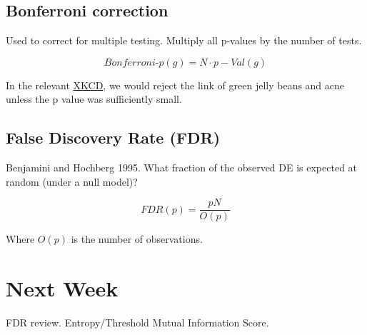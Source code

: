 \documentclass[a4paper]{article}
\begin{document}
\subsection{Bonferroni correction}
Used to correct for multiple testing. Multiply all p-values by the number of tests.

\[Bonferroni\text{-}p(g)=N\cdot p - Val(g)\]

In the relevant \href{https://xkcd.com/882/}{XKCD}, we would reject the link of green jelly beans and acne unless the p value was sufficiently small.

\subsection{False Discovery Rate (FDR)}
Benjamini and Hochberg 1995.
What fraction of the observed DE is expected at random (under a null model)?

\[FDR(p)=\frac{pN}{O(p)}\]

Where $O(p)$ is the number of observations.

\section{Next Week}
FDR review.
Entropy/Threshold Mutual Information Score.
\end{document}
